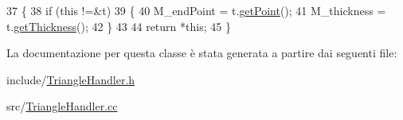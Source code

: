\begin{DoxyCode}
37         \{
38             \textcolor{keywordflow}{if} (\textcolor{keyword}{this} !=&t)
39             \{
40                 M\_endPoint = t.\hyperlink{classFractureEnd_a48187852ce2e959d00577fe4d66c2e0f}{getPoint}();
41                 M\_thickness = t.\hyperlink{classFractureEnd_a2b70172b4593324288f5779b7998d4a3}{getThickness}();
42             \}
43     
44             \textcolor{keywordflow}{return} *\textcolor{keyword}{this};
45         \}
\end{DoxyCode}


La documentazione per questa classe è stata generata a partire dai seguenti file\-:\begin{DoxyCompactItemize}
\item 
include/\hyperlink{TriangleHandler_8h}{Triangle\-Handler.\-h}\item 
src/\hyperlink{TriangleHandler_8cc}{Triangle\-Handler.\-cc}\end{DoxyCompactItemize}
